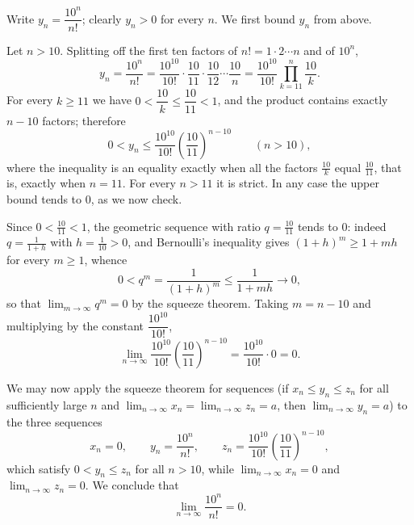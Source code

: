 \documentclass[11pt,a4paper]{article}
\newenvironment{solution}[1]{%
  \par\addvspace{1.7ex}%
  \noindent{\color{solutioncolor}\textbf{#1}}\hspace{0.55em}\ignorespaces}%
  {\par\addvspace{0.9ex}}
\begin{document}
\begin{solution}{Solution 2.1.13}\label{es:2.1.13}
Write $y_{n}=\dfrac{10^{n}}{n!}$; clearly $y_{n}>0$ for every $n$. We first bound $y_{n}$ from above.

Let $n>10$. Splitting off the first ten factors of $n!=1\cdot 2\cdots n$ and of $10^{n}$,
\[
y_{n}=\frac{10^{n}}{n!}
=\frac{10^{10}}{10!}\cdot\frac{10}{11}\cdot\frac{10}{12}\cdots\frac{10}{n}
=\frac{10^{10}}{10!}\prod_{k=11}^{n}\frac{10}{k} .
\]
For every $k\ge 11$ we have $0<\dfrac{10}{k}\le\dfrac{10}{11}<1$, and the product contains exactly $n-10$ factors; therefore
\[
0<y_{n}\le\frac{10^{10}}{10!}\left(\frac{10}{11}\right)^{n-10}
\qquad (n>10),
\]
where the inequality is an equality exactly when all the factors $\frac{10}{k}$ equal $\frac{10}{11}$, that is, exactly when $n=11$. For every $n>11$ it is strict. In any case the upper bound tends to $0$, as we now check.

Since $0<\frac{10}{11}<1$, the geometric sequence with ratio $q=\frac{10}{11}$ tends to $0$: indeed $q=\frac{1}{1+h}$ with $h=\frac{1}{10}>0$, and Bernoulli's inequality gives $(1+h)^{m}\ge 1+mh$ for every $m\ge 1$, whence
\[
0<q^{m}=\frac{1}{(1+h)^{m}}\le\frac{1}{1+mh}\longrightarrow 0 ,
\]
so that $\displaystyle\lim_{m\to\infty}q^{m}=0$ by the squeeze theorem. Taking $m=n-10$ and multiplying by the constant $\dfrac{10^{10}}{10!}$,
\[
\lim_{n\to\infty}\frac{10^{10}}{10!}\left(\frac{10}{11}\right)^{n-10}
=\frac{10^{10}}{10!}\cdot 0=0 .
\]

We may now apply the squeeze theorem for sequences (if $x_{n}\le y_{n}\le z_{n}$ for all sufficiently large $n$ and $\displaystyle\lim_{n\to\infty}x_{n}=\lim_{n\to\infty}z_{n}=a$, then $\displaystyle\lim_{n\to\infty}y_{n}=a$) to the three sequences
\[
x_{n}=0,\qquad y_{n}=\frac{10^{n}}{n!},\qquad
z_{n}=\frac{10^{10}}{10!}\left(\frac{10}{11}\right)^{n-10},
\]
which satisfy $0<y_{n}\le z_{n}$ for all $n>10$, while $\displaystyle\lim_{n\to\infty}x_{n}=0$ and $\displaystyle\lim_{n\to\infty}z_{n}=0$. We conclude that
\[
\lim_{n\to\infty}\frac{10^{n}}{n!}=0 .
\]
\end{solution}
\end{document}
